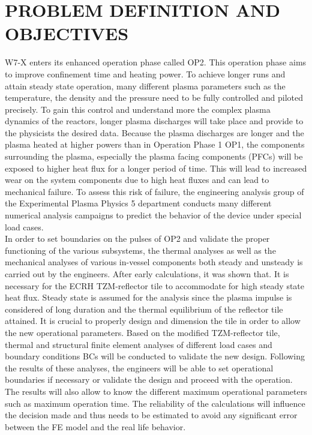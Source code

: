 \section{PROBLEM DEFINITION AND OBJECTIVES}
\normalsize{W7-X enters its enhanced operation phase called \acrshort{OP2}. This operation phase aims to improve confinement time and heating power. To achieve longer runs and attain steady state operation, many different plasma parameters such as the temperature, the density and the pressure need to be fully controlled and piloted precisely. To gain this control and understand more the complex plasma dynamics of the reactors, longer plasma discharges will take place and provide to the physicists the desired data. Because the plasma discharges are longer and the plasma heated at higher powers than in Operation Phase 1 \acrshort{OP1}, the components surrounding the plasma, especially the plasma facing components (\acrshort{PFCs}) will be exposed to higher heat flux for a longer period of time. This will lead to increased wear on the system components due to high heat fluxes and can lead to mechanical failure. To assess this risk of failure, the engineering analysis group of the Experimental Plasma Physics 5 department conducts many different numerical analysis campaigns to predict the behavior of the device under special load cases.}
\\
\break
\normalsize{\indent In order to set boundaries on the pulses of \acrshort{OP2} and validate the proper functioning of the various subsystems, the thermal analyses as well as the mechanical analyses of various in-vessel components both steady and unsteady is carried out by the engineers. After early calculations, it was shown that. It is necessary for the \acrshort{ECRH} TZM-reflector tile to accommodate for high steady state heat flux. Steady state is assumed for the analysis since the plasma impulse is considered of long duration and the thermal equilibrium of the reflector tile attained. It is crucial to properly design and dimension the tile in order to allow the new operational parameters. Based on the modified TZM-reflector tile, thermal and structural finite element analyses of different load cases and boundary conditions \acrshort{BCs} will be conducted to validate the new design. Following the results of these analyses, the engineers will be able to set operational boundaries if necessary or validate the design and proceed with the operation. The results will also allow to know the different maximum operational parameters such as maximum operation time. The reliability of the calculations will influence the decision made and thus needs to be estimated to avoid any significant error between the FE model and the real life behavior.}

